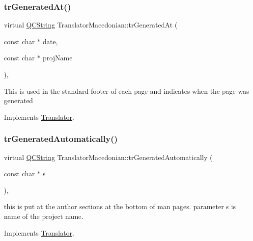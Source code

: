 \mbox{\label{class_translator_macedonian_a071826a3ccf493d80a53311c2fb4d562}} 
\subsubsection{\texorpdfstring{trGeneratedAt()}{trGeneratedAt()}}
{\footnotesize\ttfamily virtual \mbox{\hyperlink{class_q_c_string}{Q\+C\+String}} Translator\+Macedonian\+::tr\+Generated\+At (\begin{DoxyParamCaption}\item[{const char $\ast$}]{date,  }\item[{const char $\ast$}]{proj\+Name }\end{DoxyParamCaption})\hspace{0.3cm}{\ttfamily [inline]}, {\ttfamily [virtual]}}

This is used in the standard footer of each page and indicates when the page was generated 

Implements \mbox{\hyperlink{class_translator}{Translator}}.

\mbox{\label{class_translator_macedonian_a02f47bd2f2d573602c093178bac27128}} 
\subsubsection{\texorpdfstring{trGeneratedAutomatically()}{trGeneratedAutomatically()}}
{\footnotesize\ttfamily virtual \mbox{\hyperlink{class_q_c_string}{Q\+C\+String}} Translator\+Macedonian\+::tr\+Generated\+Automatically (\begin{DoxyParamCaption}\item[{const char $\ast$}]{s }\end{DoxyParamCaption})\hspace{0.3cm}{\ttfamily [inline]}, {\ttfamily [virtual]}}

this is put at the author sections at the bottom of man pages. parameter s is name of the project name. 

Implements \mbox{\hyperlink{class_translator}{Translator}}.

